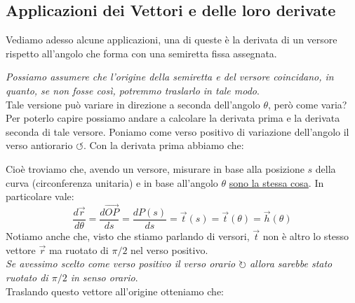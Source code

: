 \documentclass[11pt,a4paper,twoside]{article}
\theoremstyle{definition}
\begin{document}
\subsection{Applicazioni dei Vettori e delle loro derivate}

Vediamo adesso alcune applicazioni, una di queste è la derivata di un versore rispetto all'angolo che forma con una semiretta fissa assegnata.

\begin{center}
\end{center}

\textit{Possiamo assumere che l'origine della semiretta e del versore coincidano, in quanto, se non fosse così, potremmo traslarlo in tale modo}.\\
Tale versione può variare in direzione a seconda dell'angolo $\theta$, però come varia?\\
Per poterlo capire possiamo andare a calcolare la derivata prima e la derivata seconda di tale versore. Poniamo come verso positivo di variazione dell'angolo il verso antiorario $\circlearrowleft$. Con la derivata prima abbiamo che:

\begin{center}
\end{center}

Cioè troviamo che, avendo un versore, misurare in base alla posizione $s$ della curva (circonferenza unitaria) e in base all'angolo $\theta$ \underline{sono la stessa cosa}. In particolare vale:
\[ \frac{d \vec r}{d\theta} = \frac{d\vec{OP}}{ds} = \frac{dP(s)}{ds} = \vec t(s) = \vec t(\theta) = \vec h(\theta) \]
Notiamo anche che, visto che stiamo parlando di versori, $\vec t$ non è altro lo stesso vettore $\vec r$ ma ruotato di $\pi/2$ nel verso positivo.\\
\textit{Se avessimo scelto come verso positivo il verso orario $\circlearrowright$ allora sarebbe stato ruotato di $\pi/2$ in senso orario}.\\
Traslando questo vettore all'origine otteniamo che:
\end{document}
